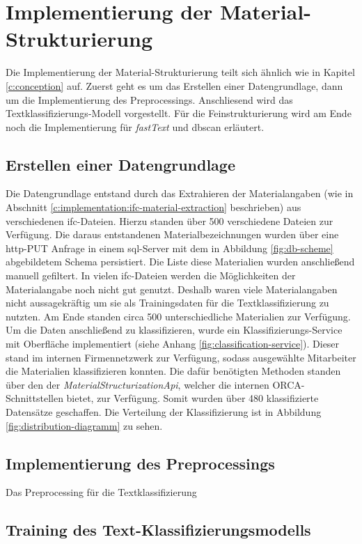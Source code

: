\section{Implementierung der Material-Strukturierung}
\label{c:implementation:structuring}
Die Implementierung der Material-Strukturierung teilt sich ähnlich wie in Kapitel \ref{c:conception} auf. Zuerst geht es um das Erstellen einer Datengrundlage, dann um die Implementierung des Preprocessings. Anschliesend wird das Textklassifizierungs-Modell vorgestellt. Für die Feinstrukturierung wird am Ende noch die Implementierung für \textit{fastText} und \ac{dbscan} erläutert.
\subsection{Erstellen einer Datengrundlage}
\label{c:implementation:data} 
Die Datengrundlage entstand durch das Extrahieren der Materialangaben (wie in Abschnitt \ref{c:implementation:ifc-material-extraction} beschrieben) aus verschiedenen \ac{ifc}-Dateien. Hierzu standen über 500 verschiedene Dateien zur Verfügung. Die daraus entstandenen Materialbezeichnungen wurden über eine \ac{http}-PUT Anfrage in einem \ac{sql}-Server mit dem in Abbildung \ref{fig:db-scheme} abgebildetem Schema persistiert. Die Liste diese Materialien wurden anschließend manuell gefiltert. In vielen \ac{ifc}-Dateien werden die Möglichkeiten der Materialangabe noch nicht gut genutzt. Deshalb waren viele Materialangaben nicht aussagekräftig um sie als Trainingsdaten für die Textklassifizierung zu nutzten. Am Ende standen circa 500 unterschiedliche Materialien zur Verfügung.
Um die Daten anschließend zu klassifizieren, wurde ein Klassifizierungs-Service mit Oberfläche implementiert (siehe Anhang \ref{fig:classification-service}). Dieser stand im internen Firmennetzwerk zur Verfügung, sodass ausgewählte Mitarbeiter die Materialien klassifizieren konnten. Die dafür benötigten Methoden standen über den  der \textit{MaterialStructurizationApi}, welcher die internen ORCA-Schnittstellen bietet, zur Verfügung. Somit wurden über 480 klassifizierte Datensätze geschaffen. Die Verteilung der Klassifizierung ist in Abbildung \ref{fig:distribution-diagramm} zu sehen.
\subsection{Implementierung des Preprocessings}
\label{c:implementation:preprocess}
Das Preprocessing für die Textklassifizierung 
\subsection{Training des Text-Klassifizierungsmodells}
\label{c:implementation:classification-training}
